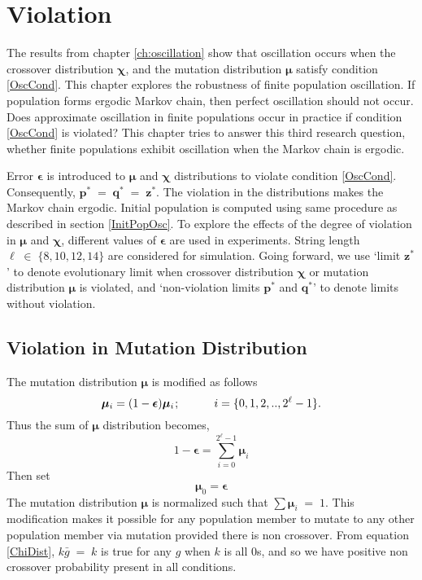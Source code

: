 \chapter{Violation} \label{ch:evolutionary limits}
The results from chapter \ref{ch:oscillation} show that oscillation occurs
when the crossover distribution $\bm{\chi}$, and the mutation distribution $\bm{\mu}$ 
satisfy condition \ref{OscCond}. This chapter explores the robustness of finite population oscillation. 
If population forms ergodic Markov chain, then perfect oscillation should not occur. Does approximate oscillation 
in finite populations occur in practice if condition \ref{OscCond} is violated? 
This chapter tries to answer this  
third research question, whether finite populations exhibit oscillation when the Markov chain 
is ergodic.

Error $\bm{\epsilon}$ is introduced to $\bm{\mu}$ and $\bm{\chi}$ distributions to 
violate condition \ref{OscCond}. Consequently, $\bm{p}^\ast \;=\; \bm{q}^\ast \;=\; \bm{z}^\ast$. 
The violation in the distributions makes the Markov chain ergodic. Initial population is 
computed using same procedure as described in section \ref{InitPopOsc}. To explore the effects of the degree  
of violation in $\bm{\mu}$ and $\bm{\chi}$, different values of $\bm{\epsilon}$ are used in experiments. 
String length $\ell \;\in\; \{8, 10, 12, 14\}$ are considered for simulation.
Going forward, we use `limit $\bm{z}^\ast$' to denote evolutionary limit when crossover distribution 
$\bm{\chi}$ or mutation distribution $\bm{\mu}$ is violated, and 
`non-violation limits $\bm{p}^\ast$ and $\bm{q}^\ast$' to denote limits without violation.

\section{Violation in Mutation Distribution}
The mutation distribution $\bm{\mu}$ is modified as follows
\[
\bm{\mu}_i = (1-\bm{\epsilon}) \bm{\mu}_i \hspace{0.01in}; \hspace{30pt} i = \{0, 1, 2,.., 2^{\ell}-1\}.
\]
Thus the sum of $\bm{\mu}$ distribution becomes, 
\[
1-\bm{\epsilon} = \sum \limits_{i=0}^{2^{\ell}-1} \bm{\mu}_i
\]
Then set
\[
\bm{\mu}_0 = \bm{\epsilon}
\]
The mutation distribution $\bm{\mu}$ is normalized such that  $\sum \bm{\mu}_i \;=\; 1$.
This modification makes it possible for any population member to mutate to any other population member via mutation 
provided there is non crossover. From equation \ref{ChiDist}, $k \bar{g} \;=\; k$ is true for any $g$ when $k$ is all $0$s, 
and so we have positive non crossover probability present in all conditions. 

